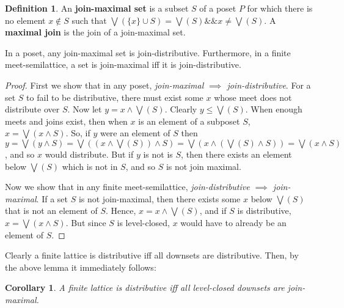 \documentclass[hoptionsi,review,format=sigplan]{acmart}
\newtheorem*{corollary}{Corollary}
\theoremstyle{definition}
\newtheorem{definition}{Definition}[section]
\begin{document}
\begin{definition}
An \textbf{join-maximal set} is a subset \(S\) of a poset \(P\) for which there is no element \(x \notin S\) such that \(\bigvee(\{x\} \cup S) = \bigvee(S) \mathbin{\&\&} x \neq \bigvee(S)\). A \textbf{maximal join} is the join of a join-maximal set.
\end{definition}

\begin{lemma}
In a poset, any join-maximal set is join-distributive. Furthermore, in a finite meet-semilattice, a set is join-maximal iff it is join-distributive.
\end{lemma}
\begin{proof}


First we show that in any poset, \textit{join-maximal \(\implies\) join-distributive}. For a set \(S\) to fail to be distributive, there must exist some \(x\) whose meet does not distribute over \(S\). Now let \(y = x \wedge \bigvee(S)\). Clearly \(y \leq \bigvee(S)\). When enough meets and joins exist, then when \(x\) is an element of a subposet \(S\), \(x = \bigvee(x \wedge S)\). So, if \(y\) were an element of \(S\) then \(y = \bigvee(y \wedge S) = \bigvee((x \wedge \bigvee(S)) \wedge S)  =  \bigvee(x \wedge (\bigvee(S) \wedge S)) = \bigvee(x \wedge S)\), and so \(x\) would distribute. But if \(y\) is not is \(S\), then there exists an element below \(\bigvee(S)\) which is not in \(S\), and so \(S\) is not join maximal.

Now we show that in any finite meet-semilattice, \textit{join-distributive \(\implies\) join-maximal}. If a set \(S\) is not join-maximal, then there exists some \(x\) below \(\bigvee(S)\) that is not an element of \(S\). Hence, \(x = x \wedge \bigvee(S)\), and if \(S\) is distributive, \(x = \bigvee(x \wedge S)\).  But since \(S\) is level-closed, \(x\) would have to already be an element of \(S\).

\end{proof}

Clearly a finite lattice is distributive iff all downsets are distributive. Then, by the above lemma it immediately follows:

\begin{corollary}
A finite lattice is distributive iff all level-closed downsets are join-maximal.
\end{corollary}

\end{document}
